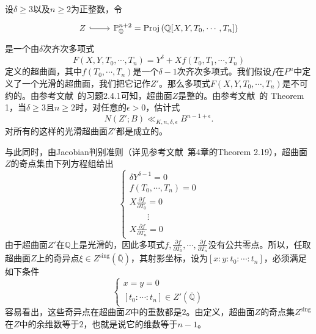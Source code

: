 \begin{example} \label{example using HB conj}
设$\delta \geqslant 3$以及$n \geqslant 2$为正整数，令
\begin{equation} \label{hypersurface Z}
\begin{tikzcd}
Z \arrow[r, hookrightarrow] & \mathbb{P}^{n+2}_{\mathbb{Q}} = \proj\left(\mathbb{Q}[X,Y,T_0,\cdots,T_n]\right)
\end{tikzcd}
\end{equation}
是一个由$\delta$次齐次多项式
\begin{equation} \label{hypersurface Z2}
F(X,Y,T_0,\cdots,T_n) = Y^\delta + Xf(T_0,T_1,\cdots,T_n)
\end{equation}
定义的超曲面，其中$f(T_0,\cdots,T_n)$是一个$\delta-1$次齐次多项式。我们假设$f$在$P^{n}$中定义了一个光滑的超曲面，我们把它记作$Z'$。那么多项式$F(X,Y,T_0,\cdots,T_n)$是不可约的。由参考文献~的习题2.4.1可知，超曲面$Z$是整的。由参考文献~的 Theorem 1，当$\delta \geqslant 3$且$n \geqslant 2$时，对任意的$\epsilon>0$，估计式
\begin{equation} \label{N(Z';B)}
N(Z';B) \ll_{K,n,\delta,\epsilon} B^{n-1+\epsilon}.
\end{equation}
对所有的这样的光滑超曲面$Z'$都是成立的。

与此同时，由Jacobian判别准则（详见参考文献~第4章的Theorem 2.19），超曲面$Z$的奇点集由下列方程组给出
\begin{equation}
\begin{cases}
\delta Y^{\delta-1} = 0 \\
f(T_0,\cdots,T_n) = 0 \\
X \frac{\partial f}{\partial T_0} = 0 \\
\phantom{hehe} \vdots \\
X \frac{\partial f}{\partial T_n} = 0
\end{cases}
\end{equation}
由于超曲面$Z'$在$\mathbb{Q}$上是光滑的，因此多项式$f, \frac{\partial f}{\partial T_0}, \cdots, \frac{\partial f}{\partial T_n}$没有公共零点。所以，任取超曲面$Z$上的奇异点$\xi\in Z^{\mathrm{sing}}(\overline{\mathbb{Q}})$，其射影坐标，设为$[x:y:t_0:\cdots:t_n]$，必须满足如下条件
\begin{equation}
\begin{cases}
x = y = 0 \\
[t_0:\cdots:t_n] \in Z'(\overline{\mathbb{Q}})
\end{cases}
\end{equation}
容易看出，这些奇异点在超曲面$Z$中的重数都是$2$。由定义，超曲面$Z$的奇点集$Z^\mathrm{sing}$在$Z$中的余维数等于$2$，也就是说它的维数等于$n-1$。


\end{example}

